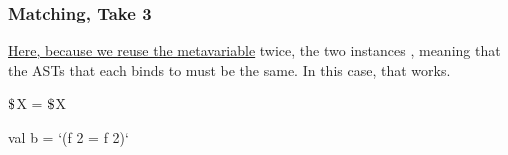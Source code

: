 \documentclass[aspectratio=169, handout]{beamer}
\newcommand{\dollar}{\mbox{\textdollar}}
\begin{document}
\begin{frame}[fragile]
  \frametitle{Matching, Take 3}

  \begin{center}
    \begin{minipage}[t][0.21\textheight][t]{\textwidth}
      \raggedright
      {\color{blue}\href{https://semgrep.dev/playground/s/YxEX}{Here, because we reuse the metavariable}} \code{$\dollar$X} twice,
      the two instances , meaning that the ASTs that each
      binds to must be the same. In this case, that works.
    \end{minipage}
    \begin{minipage}[t][0.515\textheight][t]{\textwidth}
      \begin{minipage}{0.48\textwidth}
        \centering
      \end{minipage}
      \begin{minipage}{0.48\textwidth}
        \centering
      \end{minipage}
    \end{minipage}
    \begin{minipage}[t][0.3\textheight][t]{\textwidth}
      \begin{minipage}{0.48\textwidth}
        \centering
        \begin{codeblock}
          $\dollar$X = $\dollar$X
        \end{codeblock}
      \end{minipage}
      \begin{minipage}{0.48\textwidth}
        \begin{codeblock}
          val b = `(f 2 = f 2)`
        \end{codeblock}
      \end{minipage}
    \end{minipage}
  \end{center}
\end{frame}
\end{document}
